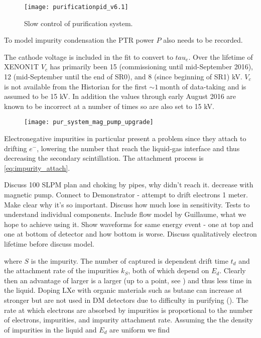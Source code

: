 {\begin{figure}
\centering
\texttt{[image: purificationpid\_v6.1]}
\caption{Slow control of purification system.}
\label{fig:electron_lifetime_model_slow_control_pur}
\end{figure}

To model impurity condensation the PTR power $P$ also needs to be recorded.

The cathode voltage is included in the fit to convert \il to $tau_e$.  Over the lifetime of XENON1T $V_c$ has primarily been 15
(commissioning until mid-September 2016), 12 (mid-September until the end of SR0), and 8 (since beginning of SR1) kV.  $V_c$ is not
available from the Historian for the first ${\sim} 1\ \mathrm{month}$ of data-taking and is assumed to be 15 kV.  In addition the values
through early August 2016 are known to be incorrect at a number of times so are also set to 15 kV.

\begin{figure}
\centering
\texttt{[image: pur\_system\_mag\_pump\_upgrade]}
\caption{}
\label{fig:mag_pump}
\end{figure}

Electronegative impurities
in particular present a problem
since they attach to drifting $e^{-}$,
lowering the number that reach the liquid-gas interface and thus decreasing the secondary scintillation.  The attachment process
is \eqref{eq:impurity_attach}.

Discuss 100 SLPM plan and choking by pipes, why didn't reach it.   decrease with magnetic
pump.  Connect to Demonstrator - attempt to drift electrons 1 meter.  Make clear why it's so important.  Discuss how much lose in
sensitivity.  Tests to understand individual components.  Include flow model by Guillaume, what we hope to achieve using it.  Show
waveforms for same energy event - one at top and one at bottom of detector and how bottom is worse.  Discuss qualitatively electron
lifetime before discuss model.

\noindent where $S$ is the impurity.  The number of \electron captured is dependent drift time $t_{d}$ and the
attachment rate of
the impurities $k_{S}$, both of which depend on $E_{d}$.  Clearly then an advantage of larger
\efields is a larger
\vd (up to a point, see ) and thus less time in the liquid.  Doping LXe with organic materials such as butane
can increase \vd at stronger
\efields but are not used in DM detectors due to difficulty in purifying ().  The rate at which electrons are
absorbed by impurities is proportional to the number of electrons, impurities, and impurity attachment rate.  Assuming the the density
of impurities in the liquid and $E_{d}$ are uniform we find

}
